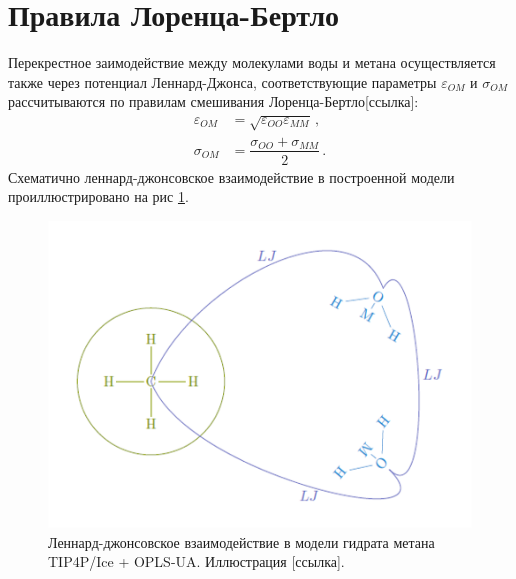 \section{Правила Лоренца-Бертло}
Перекрестное заимодействие между молекулами воды и метана осуществляется также через потенциал Леннард-Джонса, соответствующие параметры $\varepsilon_{OM}$ и $\sigma_{OM}$ рассчитываются по правилам смешивания Лоренца-Бертло[ссылка]:
\begin{align}
    \varepsilon_{OM} &= \sqrt{\varepsilon_{OO}\varepsilon_{MM}}\,, \label{eq2.6.2} \\
    \sigma_{OM} &= \dfrac{\sigma_{OO}+\sigma_{MM}}{2}\,.
    \label{eq2.6.3}
\end{align}
Схематично леннард-джонсовское взаимодействие в построенной модели проиллюстрировано на рис \ref{fig2.6.4}.
\begin{figure}[H]
    \centering
    \includegraphics[width=.8\linewidth]{figures/hydrmodel.png}
    \caption{Леннард-джонсовское взаимодействие в модели гидрата метана TIP4P/Ice + OPLS-UA. Иллюстрация [ссылка].}
    \label{fig2.6.4}
\end{figure}
\pagebreak

